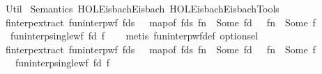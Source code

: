 %
\begin{isabellebody}%
%
%
\isadelimdocument
%
\endisadelimdocument
%
\isatagdocument
%
\isamarkuptrue%
%
\endisatagdocument
{\isafolddocument}%
%
\isadelimdocument
%
\endisadelimdocument
%
\isadelimtheory
%
\endisadelimtheory
%
\isatagtheory
{}\isamarkupfalse%
\ Util\isanewline
{}\ Semantics\ {\isachardoublequoteopen}HOL{\isacharminus}{\kern0pt}Eisbach{\isachardot}{\kern0pt}Eisbach{\isachardoublequoteclose}\ {\isachardoublequoteopen}HOL{\isacharminus}{\kern0pt}Eisbach{\isachardot}{\kern0pt}Eisbach{\isacharunderscore}{\kern0pt}Tools{\isachardoublequoteclose}\isanewline
{}%
\endisatagtheory
{\isafoldtheory}%
%
\isadelimtheory
\isanewline
%
\endisadelimtheory
\isanewline
\isanewline
{}\isamarkupfalse%
\ finterp{\isacharunderscore}{\kern0pt}extract{\isacharunderscore}{\kern0pt}{}{\isacharcolon}{\kern0pt}\ {\isachardoublequoteopen}fun{\isacharunderscore}{\kern0pt}interp{\isacharunderscore}{\kern0pt}wf\ fds\ {\isasymGamma}\ {\isasymLongrightarrow}\ map{\isacharunderscore}{\kern0pt}of\ fds\ fn\ {\isacharequal}{\kern0pt}\ Some\ fd\ {\isasymLongrightarrow}\ {\isasymGamma}\ fn\ {\isacharequal}{\kern0pt}\ Some\ f\ {\isasymLongrightarrow}\ \isanewline
\ \ fun{\isacharunderscore}{\kern0pt}interp{\isacharunderscore}{\kern0pt}single{\isacharunderscore}{\kern0pt}wf\ fd\ f{\isachardoublequoteclose}\isanewline
%
\isadelimproof
\ \ %
\endisadelimproof
%
\isatagproof
{}\isamarkupfalse%
\ {\isacharparenleft}{\kern0pt}metis\ fun{\isacharunderscore}{\kern0pt}interp{\isacharunderscore}{\kern0pt}wf{\isacharunderscore}{\kern0pt}def\ option{\isachardot}{\kern0pt}sel{\isacharparenright}{\kern0pt}%
\endisatagproof
{\isafoldproof}%
%
\isadelimproof
\isanewline
%
\endisadelimproof
\isanewline
{}\isamarkupfalse%
\ finterp{\isacharunderscore}{\kern0pt}extract{\isacharunderscore}{\kern0pt}{}{\isacharcolon}{\kern0pt}\ {\isachardoublequoteopen}fun{\isacharunderscore}{\kern0pt}interp{\isacharunderscore}{\kern0pt}wf\ fds\ {\isasymGamma}\ {\isasymLongrightarrow}\ map{\isacharunderscore}{\kern0pt}of\ fds\ fn\ {\isacharequal}{\kern0pt}\ Some\ fd\ {\isasymLongrightarrow}\ {\isasymGamma}\ fn\ {\isacharequal}{\kern0pt}\ Some\ f\ {\isasymLongrightarrow}\isanewline
\ \ \ fun{\isacharunderscore}{\kern0pt}interp{\isacharunderscore}{\kern0pt}single{\isacharunderscore}{\kern0pt}wf{\isacharunderscore}{\kern0pt}{}\ fd\ f{\isachardoublequoteclose}\isanewline

\end{isabellebody}
